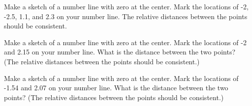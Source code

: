 
\begin{problem}
\item Make a sketch of a number line with zero at the center.  Mark
  the locations of -2, -2.5, 1.1, and 2.3 on your number line.
  The relative distances between the points should be consistent.

  \vfill

\item Make a sketch of a number line with zero at the center.  Mark
  the locations of -2 and 2.15 on your number line. What is the
  distance between the two points?
  (The relative distances between the points should be consistent.)

  \vfill

\item Make a sketch of a number line with zero at the center.  Mark
  the locations of -1.54 and 2.07 on your number line. What is the
  distance between the two points?
  (The relative distances between the points should be consistent.)

  \vfill

\end{problem}


